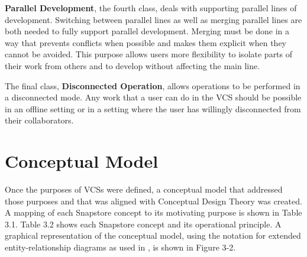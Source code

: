 \textbf{Parallel Development}, the fourth class, deals with supporting parallel lines of development. Switching between parallel lines as well as merging parallel lines are both needed to fully support parallel development. Merging must be done in a way that prevents conflicts when possible and makes them explicit when they cannot be avoided. This purpose allows users more flexibility to isolate parts of their work from others and to develop without affecting the main line.

The final class, \textbf{Disconnected Operation}, allows operations to be performed in a disconnected mode. Any work that a user can do in the VCS should be possible in an offline setting or in a setting where the user has willingly disconnected from their collaborators.

\section{Conceptual Model}

Once the purposes of VCSs were defined, a conceptual model that addressed those purposes and that was aligned with Conceptual Design Theory \cite{Jackson} was created. A mapping of each Snapstore concept to its motivating purpose is shown in Table 3.1. Table 3.2 shows each Snapstore concept and its operational principle. A graphical representation of the conceptual model, using the notation for extended entity-relationship diagrams as used in \cite{SantiagoJackson}, is shown in Figure 3-2.

